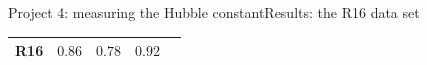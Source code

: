 \documentclass{beamer}
\newcommand{\NGC}{\mathrm{NGC4258}}
\begin{document}
\begin{frame}{Project 4: measuring the Hubble constant}{Results: the R16 data set}
{\begin{table}[tbp]
\begin{tabular}{@{}ccccc}
 R16 &  $ 0.86 $ & $ 0.78 $ & $0.92$  \\
  

\hline
\end{tabular}
\end{table}}



\end{frame}
\end{document}
